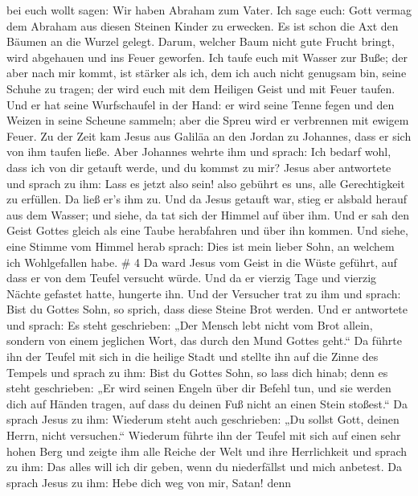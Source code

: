 bei euch wollt sagen: Wir haben Abraham zum Vater. Ich sage euch: Gott
vermag dem Abraham aus diesen Steinen Kinder zu erwecken. 
Es ist schon die Axt den Bäumen an die Wurzel gelegt. Darum, welcher
Baum nicht gute Frucht bringt, wird abgehauen und ins Feuer geworfen.
 Ich taufe euch mit Wasser zur Buße; der aber nach mir
kommt, ist stärker als ich, dem ich auch nicht genugsam bin, seine
Schuhe zu tragen; der wird euch mit dem Heiligen Geist und mit Feuer
taufen.  Und er hat seine Wurfschaufel in der Hand: er wird
seine Tenne fegen und den Weizen in seine Scheune sammeln; aber die
Spreu wird er verbrennen mit ewigem Feuer.  Zu der Zeit kam
Jesus aus Galiläa an den Jordan zu Johannes, dass er sich von ihm taufen
ließe.  Aber Johannes wehrte ihm und sprach: Ich bedarf
wohl, dass ich von dir getauft werde, und du kommst zu mir?
 Jesus aber antwortete und sprach zu ihm: Lass es jetzt
also sein! also gebührt es uns, alle Gerechtigkeit zu erfüllen. Da ließ
er's ihm zu.  Und da Jesus getauft war, stieg er alsbald
herauf aus dem Wasser; und siehe, da tat sich der Himmel auf über ihm.
Und er sah den Geist Gottes gleich als eine Taube herabfahren und über
ihn kommen.  Und siehe, eine Stimme vom Himmel herab
sprach: Dies ist mein lieber Sohn, an welchem ich Wohlgefallen habe. \#
4  Da ward Jesus vom Geist in die Wüste geführt, auf dass er
von dem Teufel versucht würde.  Und da er vierzig Tage und
vierzig Nächte gefastet hatte, hungerte ihn.  Und der
Versucher trat zu ihm und sprach: Bist du Gottes Sohn, so sprich, dass
diese Steine Brot werden.  Und er antwortete und sprach: Es
steht geschrieben: „Der Mensch lebt nicht vom Brot allein, sondern von
einem jeglichen Wort, das durch den Mund Gottes geht.``  Da
führte ihn der Teufel mit sich in die heilige Stadt und stellte ihn auf
die Zinne des Tempels  und sprach zu ihm: Bist du Gottes
Sohn, so lass dich hinab; denn es steht geschrieben: „Er wird seinen
Engeln über dir Befehl tun, und sie werden dich auf Händen tragen, auf
dass du deinen Fuß nicht an einen Stein stoßest.``  Da
sprach Jesus zu ihm: Wiederum steht auch geschrieben: „Du sollst Gott,
deinen Herrn, nicht versuchen.``  Wiederum führte ihn der
Teufel mit sich auf einen sehr hohen Berg und zeigte ihm alle Reiche der
Welt und ihre Herrlichkeit  und sprach zu ihm: Das alles
will ich dir geben, wenn du niederfällst und mich anbetest.
 Da sprach Jesus zu ihm: Hebe dich weg von mir, Satan! denn
